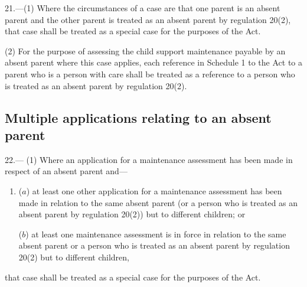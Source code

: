 \documentclass[12pt,a4paper]{article}
\begin{document}
21.—(1) Where the circumstances of a case are that one parent is an absent parent and the other parent is treated as an absent parent by regulation 20(2), that case shall be treated as a special case for the purposes of the Act.

(2) For the purpose of assessing the child support maintenance payable by an absent parent where this case applies, each reference in Schedule 1 to the Act to a parent who is a person with care shall be treated as a reference to a person who is treated as an absent parent by regulation 20(2).

\subsection[22. Multiple applications relating to an absent parent]{Multiple applications relating to an absent parent}

22.—%
%
%
(1) Where an application for a maintenance assessment has been made in respect of an absent parent and—
\begin{enumerate}\item[]
($a$) at least one other application for a maintenance assessment has been made in relation to the same absent parent (or a person who is treated as an absent parent by regulation 20(2)) but to different children; or

($b$) at least one maintenance assessment is in force in relation to the same absent parent or a person who is treated as an absent parent by regulation 20(2) but to different children,
\end{enumerate}
that case shall be treated as a special case for the purposes of the Act.

%
%
\end{document}
